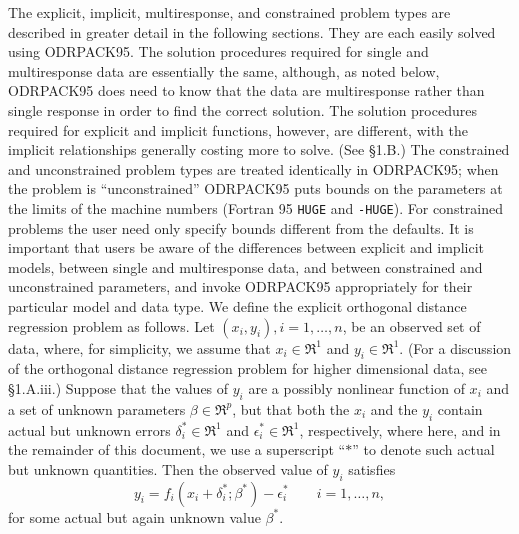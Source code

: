 \noindent The explicit, implicit, multiresponse, and constrained problem
types are described in greater detail in the following sections. They
are each easily solved using ODRPACK95. The solution procedures required
for single and multiresponse data are essentially the same, although, as
noted below, ODRPACK95 does need to know that the data are multiresponse
rather than single response in order to find the correct solution. The
solution procedures required for explicit and implicit functions,
however, are different, with the implicit relationships generally
costing more to solve. (See \S 1.B.) The constrained and unconstrained
problem types are treated identically in ODRPACK95; when the problem
is ``unconstrained'' ODRPACK95 puts bounds on the parameters at the
limits of the machine numbers (Fortran 95 {\tt HUGE} and {\tt -HUGE}).
For constrained problems the user need only specify bounds different from
the defaults. It is important that users be aware of the differences
between explicit and implicit models, between single and multiresponse
data, and between constrained and unconstrained parameters, and invoke
ODRPACK95 appropriately for their particular model and data type.
\bigskip
{} 
\medskip
\noindent We define the explicit orthogonal distance regression problem as follows. Let $(x_{i},y_{i}),
i=1,\ldots, n$, be an observed set of data, where, for simplicity, we assume that $x_{i}\in\Re^{1}$ and $y_{i}\in\Re^{1}$. (For a discussion of the orthogonal distance regression problem for higher dimensional data, see \S 1.A.iii.) Suppose that the values of $y_i$ are a possibly nonlinear function of $x_i$ and a set of unknown parameters $\beta\in\Re^p$, but that both the $x_i$ and the $y_i$ contain actual but unknown errors $\delta^{*}_{i}\in\Re^1$ and
$\epsilon^{*}_{i}\in\Re^1$, respectively, where here, and in the remainder of this document, we use a superscript ``$\ast$'' to denote such actual but unknown quantities. Then the observed value of $y_i$ satisfies
$$y_{i}=f_{i}(x_{i}+\delta^{*}_{i};\beta^{*})-\epsilon^{*}_{i}\qquad
i=1,\ldots, n,$$
for some actual but again unknown value $\beta^*$.

